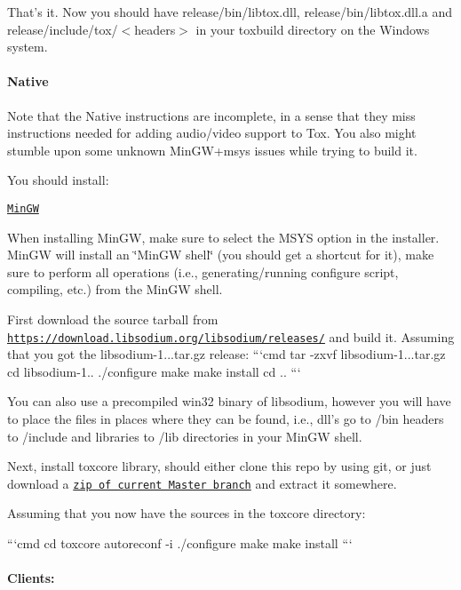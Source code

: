 That's it. Now you should have {\ttfamily release/bin/libtox.\+dll}, {\ttfamily release/bin/libtox.\+dll.\+a} and {\ttfamily release/include/tox/$<$headers$>$} in your {\ttfamily toxbuild} directory on the Windows system.

\label{_windows-native}%
 \paragraph*{Native}

Note that the Native instructions are incomplete, in a sense that they miss instructions needed for adding audio/video support to Tox. You also might stumble upon some unknown Min\+G\+W+msys issues while trying to build it.

You should install\+:
\begin{DoxyItemize}
\item \href{http://sourceforge.net/projects/mingw/}{\tt Min\+G\+W}
\end{DoxyItemize}

When installing Min\+G\+W, make sure to select the M\+S\+Y\+S option in the installer. Min\+G\+W will install an \char`\"{}\+Min\+G\+W shell\char`\"{} (you should get a shortcut for it), make sure to perform all operations (i.\+e., generating/running configure script, compiling, etc.) from the Min\+G\+W shell.

First download the source tarball from \href{https://download.libsodium.org/libsodium/releases/}{\tt https\+://download.\+libsodium.\+org/libsodium/releases/} and build it. Assuming that you got the libsodium-\/1...\+tar.\+gz release\+: ```cmd tar -\/zxvf libsodium-\/1...\+tar.\+gz cd libsodium-\/1.. ./configure make make install cd .. ```

You can also use a precompiled win32 binary of libsodium, however you will have to place the files in places where they can be found, i.\+e., dll's go to /bin headers to /include and libraries to /lib directories in your Min\+G\+W shell.

Next, install toxcore library, should either clone this repo by using git, or just download a \href{https://github.com/irungentoo/toxcore/archive/master.zip}{\tt zip of current Master branch} and extract it somewhere.

Assuming that you now have the sources in the toxcore directory\+:

```cmd cd toxcore autoreconf -\/i ./configure make make install ```

\label{_Clients}%
 \paragraph*{Clients\+:}

